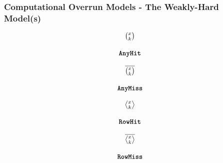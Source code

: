 \begin{frame}
    \frametitle{Computational Overrun Models - The Weakly-Hard Model(s)}
    \begin{minipage}[c]{0.24\textwidth}
        \centering
        \begin{equation*}
            \begin{matrix}
                {\Large \binom{x_{}}{k_{}}}   \\
                            \\
                \texttt{\textbf{AnyHit}}{}
            \end{matrix}
        \end{equation*}
    \end{minipage}\hfill
    \begin{minipage}[c]{0.24\textwidth}
        \centering
        \begin{equation*}
            \begin{matrix}
                {\Large \overline{\binom{x_{}}{k_{}}}}   \\
                            \\
                \texttt{\textbf{AnyMiss}}{}
            \end{matrix}
        \end{equation*}
    \end{minipage}\hfill
    \begin{minipage}[c]{0.24\textwidth}
        \centering
        \begin{equation*}
            \begin{matrix}
                {\Large \rowhit{}}   \\
                            \\
                \tRH{}
            \end{matrix}
        \end{equation*}
    \end{minipage}\hfill
    \begin{minipage}[c]{0.24\textwidth}
        \centering
        \begin{equation*}
            \begin{matrix}
                {\Large \rowmiss{}}   \\
                            \\
                \tRM{}
            \end{matrix}
        \end{equation*}
    \end{minipage}

    \vspace{1cm}


\end{frame}
